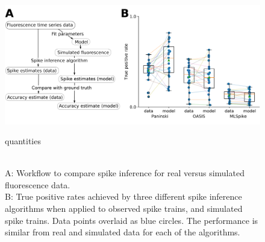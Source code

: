 \begin{figure}[h]
\centering
  \includegraphics[width=\textwidth]{figures/calcium_chapter/Figure2.png}
  \caption{\\
  A: Workflow to compare spike inference for real versus simulated fluorescence data.\\
  B: True positive rates achieved by three different spike inference algorithms when applied to observed spike trains, and simulated spike trains. Data points overlaid as blue circles. The performance is similar from real and simulated data for each of the algorithms.}quantities
  \label{fig:three_algo_comparison}
\end{figure}

